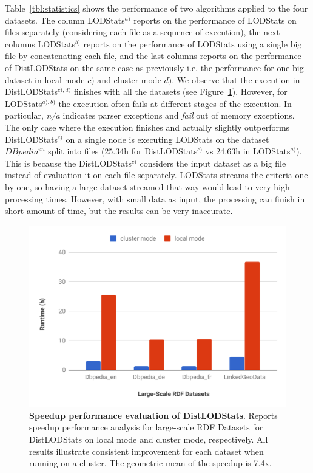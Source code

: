Table~\ref{tbl:statistics} shows the performance of two algorithms applied to the four datasets.
The column LODStats$^{a)}$ reports on the performance of LODStats on files separately (considering each file as a sequence of execution), the next columns LODStats$^{b)}$ reports on the performance of LODStats using a single big file by concatenating each file, and the last columns reports on the performance of DistLODStats on the same case as previously i.e. the performance for one big dataset in local mode $c)$ and cluster mode $d)$.
We observe that the execution in DistLODStats$^{c), d)}$ finishes with all the datasets (see Figure~\ref{fig:Speedup}).
However, for LODStats$^{a), b)}$ the execution often fails at different stages of the execution.
In particular, \emph{n/a} indicates parser exceptions and \emph{fail} out of memory exceptions.
The only case where the execution finishes and actually slightly outperforms DistLODStats$^{c)}$ on a single node is executing LODStats on the dataset ${DBpedia}^{en}$ split into files (25.34h for DistLODStats$^{c)}$ vs 24.63h in LODStats$^{a)}$). 
This is because the DistLODStats$^{c)}$ considers the input dataset as a big file instead of evaluation it on each file separately. 
LODStats streams the criteria one by one, so having a large dataset streamed that way would lead to very high processing times.
However, with small data as input, the processing can finish in short amount of time, but the results can be very inaccurate.

\begin{figure}
  \includegraphics[width=1.0\columnwidth]{images/4_distlodstats/distlodstats-speedup-performance.pdf}
    \caption{\textbf{Speedup performance evaluation of DistLODStats}. Reports speedup performance analysis for large-scale RDF Datasets for DistLODStats on local mode and cluster mode, respectively. All results illustrate consistent improvement for each dataset when running on a cluster. The geometric mean of the speedup is 7.4x.}
    \label{fig:Speedup}
\end{figure}

